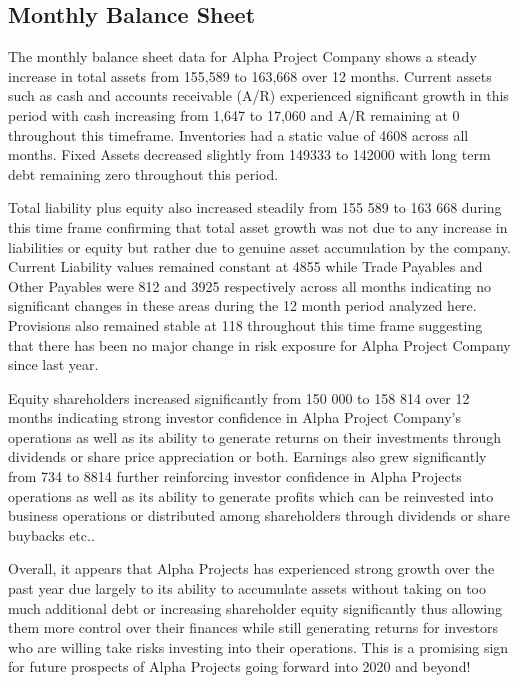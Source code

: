 

\subsection{Monthly Balance Sheet}\label{sec:title}

The monthly balance sheet data for Alpha Project Company shows a steady increase in total assets from 155,589 to 163,668 over 12 months. Current assets such as cash and accounts receivable (A/R) experienced significant growth in this period with cash increasing from 1,647 to 17,060 and A/R remaining at 0 throughout this timeframe. Inventories had a static value of 4608 across all months. Fixed Assets decreased slightly from 149333 to 142000 with long term debt remaining zero throughout this period. 

Total liability plus equity also increased steadily from 155 589 to 163 668 during this time frame confirming that total asset growth was not due to any increase in liabilities or equity but rather due to genuine asset accumulation by the company. Current Liability values remained constant at 4855 while Trade Payables and Other Payables were 812 and 3925 respectively across all months indicating no significant changes in these areas during the 12 month period analyzed here. Provisions also remained stable at 118 throughout this time frame suggesting that there has been no major change in risk exposure for Alpha Project Company since last year. 

Equity shareholders increased significantly from 150 000 to 158 814 over 12 months indicating strong investor confidence in Alpha Project Company's operations as well as its ability to generate returns on their investments through dividends or share price appreciation or both. Earnings also grew significantly from 734 to 8814 further reinforcing investor confidence in Alpha Projects operations as well as its ability to generate profits which can be reinvested into business operations or distributed among shareholders through dividends or share buybacks etc.. 

Overall, it appears that Alpha Projects has experienced strong growth over the past year due largely to its ability to accumulate assets without taking on too much additional debt or increasing shareholder equity significantly thus allowing them more control over their finances while still generating returns for investors who are willing take risks investing into their operations. This is a promising sign for future prospects of Alpha Projects going forward into 2020 and beyond!